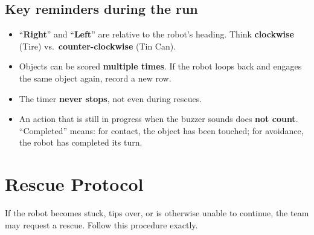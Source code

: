 \documentclass[a4]{article}
\begin{document}
\subsection*{Key reminders during the run}

\begin{itemize}
    \item ``\textbf{Right}'' and ``\textbf{Left}'' are relative to the robot's heading. Think \textbf{clockwise} (Tire) vs.\ \textbf{counter-clockwise} (Tin Can).
    \item Objects can be scored \textbf{multiple times}. If the robot loops back and engages the same object again, record a new row.
    \item The timer \textbf{never stops}, not even during rescues.
    \item An action that is still in progress when the buzzer sounds does \textbf{not count}. ``Completed'' means: for contact, the object has been touched; for avoidance, the robot has completed its turn.
\end{itemize}

\pagebreak
\section*{Rescue Protocol}

If the robot becomes stuck, tips over, or is otherwise unable to continue, the team may request a rescue. Follow this procedure exactly.
\end{document}
